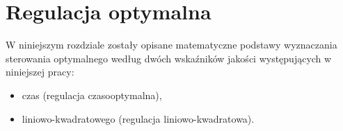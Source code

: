 \chapter{Regulacja optymalna}
\label{cha:reg-opt}

W niniejszym rozdziale zostały opisane matematyczne podstawy wyznaczania sterowania optymalnego według dwóch wskaźników jakości występujących w niniejszej pracy:
\begin{itemize}
    \item czas (regulacja czasooptymalna),
    \item liniowo-kwadratowego (regulacja liniowo-kwadratowa).
\end{itemize}





